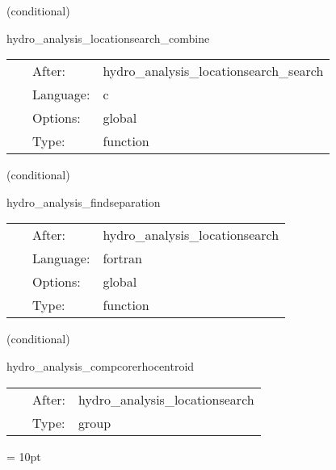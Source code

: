 \vspace{5mm}

   (conditional) 

\hspace{5mm} hydro\_analysis\_locationsearch\_combine 

\hspace{5mm}{\it communicate and verify the location of the maximum density } 


\hspace{5mm}

 \begin{tabular*}{160mm}{cll} 
~ & After:  & hydro\_analysis\_locationsearch\_search \\ 
~ & Language:  & c \\ 
~ & Options:  & global \\ 
~ & Type:  & function \\ 
\end{tabular*} 


\vspace{5mm}

   (conditional) 

\hspace{5mm} hydro\_analysis\_findseparation 

\hspace{5mm}{\it compute the proper distance between the maximum of the density and the origin (along a straight coordinate line) } 


\hspace{5mm}

 \begin{tabular*}{160mm}{cll} 
~ & After:  & hydro\_analysis\_locationsearch \\ 
~ & Language:  & fortran \\ 
~ & Options:  & global \\ 
~ & Type:  & function \\ 
\end{tabular*} 


\vspace{5mm}

   (conditional) 

\hspace{5mm} hydro\_analysis\_compcorerhocentroid 

\hspace{5mm}{\it compute center of mass of core region } 


\hspace{5mm}

 \begin{tabular*}{160mm}{cll} 
~ & After:  & hydro\_analysis\_locationsearch \\ 
~ & Type:  & group \\ 
\end{tabular*} 



\vspace{5mm}\parskip = 10pt 
